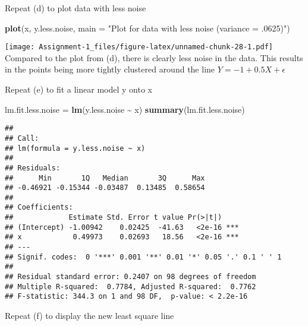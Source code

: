 \documentclass[
]{article}
\newenvironment{Shaded}{\begin{snugshade}}{\end{snugshade}}
\newcommand{\AttributeTok}[1]{\textcolor[rgb]{0.13,0.29,0.53}{#1}}
\newcommand{\FunctionTok}[1]{\textcolor[rgb]{0.13,0.29,0.53}{\textbf{#1}}}
\newcommand{\NormalTok}[1]{#1}
\newcommand{\OtherTok}[1]{\textcolor[rgb]{0.56,0.35,0.01}{#1}}
\newcommand{\SpecialCharTok}[1]{\textcolor[rgb]{0.81,0.36,0.00}{\textbf{#1}}}
\newcommand{\StringTok}[1]{\textcolor[rgb]{0.31,0.60,0.02}{#1}}
\begin{document}
Repeat (d) to plot data with less noise

\begin{Shaded}
\begin{Highlighting}[]
\FunctionTok{plot}\NormalTok{(x, y.less.noise, }\AttributeTok{main =} \StringTok{"Plot for data with less noise (variance = .0625)"}\NormalTok{)}
\end{Highlighting}
\end{Shaded}

\texttt{[image: Assignment-1\_files/figure-latex/unnamed-chunk-28-1.pdf]}
Compared to the plot from (d), there is clearly less noise in the data.
This results in the points being more tightly clustered around the line
\(Y=-1+0.5 X+\epsilon\)

Repeat (e) to fit a linear model y onto x

\begin{Shaded}
\begin{Highlighting}[]
\NormalTok{lm.fit.less.noise }\OtherTok{=} \FunctionTok{lm}\NormalTok{(y.less.noise }\SpecialCharTok{\textasciitilde{}}\NormalTok{ x)}
\FunctionTok{summary}\NormalTok{(lm.fit.less.noise)}
\end{Highlighting}
\end{Shaded}

\begin{verbatim}
## 
## Call:
## lm(formula = y.less.noise ~ x)
## 
## Residuals:
##      Min       1Q   Median       3Q      Max 
## -0.46921 -0.15344 -0.03487  0.13485  0.58654 
## 
## Coefficients:
##             Estimate Std. Error t value Pr(>|t|)    
## (Intercept) -1.00942    0.02425  -41.63   <2e-16 ***
## x            0.49973    0.02693   18.56   <2e-16 ***
## ---
## Signif. codes:  0 '***' 0.001 '**' 0.01 '*' 0.05 '.' 0.1 ' ' 1
## 
## Residual standard error: 0.2407 on 98 degrees of freedom
## Multiple R-squared:  0.7784, Adjusted R-squared:  0.7762 
## F-statistic: 344.3 on 1 and 98 DF,  p-value: < 2.2e-16
\end{verbatim}

Repeat (f) to display the new least square line
\end{document}

